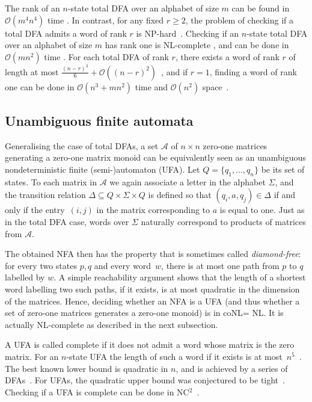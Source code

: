 \documentclass[11pt,a4paper]{amsart}
\newcommand{\OO}{\mathcal{O}}
\newcommand{\Aa}{\mathcal{A}}
\newcommand{\NCT}{\textnormal{\textsf{NC$^2$}}\xspace}
\newcommand{\NP}{\textnormal{\textsf{NP}}\xspace}
\newcommand{\NL}
{\textnormal{\textsf{NL}}\xspace}
\newcommand{\coNL}
{\textnormal{\textsf{coNL}}\xspace}
\theoremstyle{plain}
\theoremstyle{definition}
\theoremstyle{defC}
\theoremstyle{thmC}
\theoremstyle{plain}
\numberwithin{equation}{section}
\begin{document}
The rank of an $n$-state total DFA over an alphabet of size $m$ can be found in $\OO(m^4n^4)$ time \cite[Theorem 1]{Rystsov1992Rank}.
In contrast, for any fixed $r \ge 2$, the problem of checking if a total DFA admits a word of rank $r$ is \NP-hard~\cite{GORALCIK1995}. Checking if an $n$-state total DFA over an alphabet of size $m$ has rank one is \NL-complete \cite{Holzer2018,Volkov2022}, and can be done in $\OO(m n^2)$ time \cite{Eppstein1990,Volkov2008}. For each total DFA of rank $r$, there exists a word of rank $r$ of length at most $\frac{(n - r)^3}{6} + \OO((n - r)^2)$~\cite{Klyachko1987}, and if $r = 1$,  finding a word of rank one can be done in $\OO(n^3 + mn^2)$ time and $\OO(n^2)$ space~\cite{Eppstein1990}.

\subsection{Unambiguous finite automata}

Generalising the case of total DFAs, a set $\Aa$ of $n \times n$ zero-one matrices generating a zero-one matrix monoid can be equivalently seen as an unambiguous nondeterministic finite (semi-)automaton (UFA). Let $Q = \{q_1, \ldots, q_n\}$ be its set of states. To each matrix in $\Aa$ we again associate a letter in the alphabet $\Sigma$, and the transition relation $\Delta \subseteq Q \times \Sigma \times Q$ is defined so that $(q_i,a,q_j) \in \Delta$ if and only if the entry~$(i, j)$ in the matrix corresponding to $a$ is equal to one. Just as in the total DFA case, words over $\Sigma$ naturally correspond to products of matrices from $\Aa$.

The obtained NFA then has the property that is sometimes called \emph{diamond-free}: for every two states $p, q$ and every word~$w$, there is at most one path from $p$ to $q$ labelled by $w$. A simple reachability argument shows that the length of a shortest word labelling two such paths, if it exists, is at most quadratic in the dimension of the matrices. Hence, deciding whether an NFA is a UFA (and thus whether a set of zero-one matrices generates a zero-one monoid)  is in \coNL = \NL. It is actually \NL-complete as described in the next subsection.

A UFA is called complete if it does not admit a word whose matrix is the zero matrix. For an $n$-state UFA the length of such a word if it exists is at most~$n^5$~\cite{Kiefer2021}. 
The best known lower bound is quadratic in $n$, and is achieved by a series of DFAs~\cite{Rystsov1997}. 
For UFAs, the quadratic upper bound was conjectured to be tight~\cite[Conjecture 2]{Rystsov1992Rank}. Checking if a UFA is complete can be done in \NCT~\cite{Kiefer2021}. 
\end{document}
